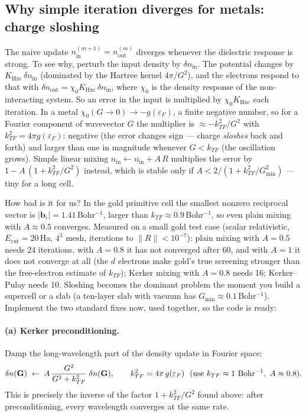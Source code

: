 \subsection{Why simple iteration diverges for metals: charge sloshing}

The naive update $n_{\mathrm{in}}^{(m+1)} = n_{\mathrm{out}}^{(m)}$ diverges
whenever the dielectric response is strong. To see why, perturb the input
density by $\delta n_{\mathrm{in}}$. The potential changes by
$K_{\mathrm{Hxc}}\,\delta n_{\mathrm{in}}$ (dominated by the Hartree
kernel $4\pi/G^2$), and the electrons respond to that with
$\delta n_{\mathrm{out}} = \chi_0 K_{\mathrm{Hxc}}\,\delta n_{\mathrm{in}}$,
where $\chi_0$ is the density response of the non-interacting system. So an
error in the input is multiplied by $\chi_0 K_{\mathrm{Hxc}}$ each
iteration. In a metal $\chi_0(G\to0) \to -g(\varepsilon_F)$, a finite
negative number, so for a Fourier component of wavevector $G$ the
multiplier is $\approx -k_{TF}^2/G^2$ with $k_{TF}^2 = 4\pi
g(\varepsilon_F)$: negative (the error changes sign --- charge
\emph{sloshes} back and forth) and larger than one in magnitude whenever
$G < k_{TF}$ (the oscillation grows). Simple linear mixing
$n_{\mathrm{in}} \gets n_{\mathrm{in}} + A\,R$ multiplies the error by
$1 - A\,(1 + k_{TF}^2/G^2)$ instead, which is stable only if
$A < 2/(1 + k_{TF}^2/G_{\min}^2)$ --- tiny for a long cell.

How bad is it for us? In the gold primitive cell the smallest nonzero
reciprocal vector is $|\mathbf b_i| = 1.41$\,Bohr$^{-1}$, larger than
$k_{TF} \approx 0.9$\,Bohr$^{-1}$, so even plain mixing with
$A \approx 0.5$ converges. Measured on a small gold test case (scalar
relativistic, $E_{\mathrm{cut}} = 20$\,Ha, $4^3$ mesh, iterations to
$\|R\| < 10^{-7}$): plain mixing with $A = 0.5$ needs 24 iterations, with
$A = 0.8$ it has not converged after 60, and with $A = 1$ it does not
converge at all (the $d$ electrons make gold's true screening stronger
than the free-electron estimate of $k_{TF}$); Kerker mixing with $A = 0.8$
needs 16; Kerker--Pulay needs 10. Sloshing becomes the dominant problem the
moment you build a supercell or a slab (a ten-layer slab with vacuum has
$G_{\min} \approx 0.1$\,Bohr$^{-1}$). Implement the two standard fixes now, used
together, so the code is ready:

\paragraph{(a) Kerker preconditioning.} Damp the long-wavelength part of the
density update in Fourier space:
\begin{equation}
\delta n(\mathbf{G}) \;\gets\; A\, \frac{G^2}{G^2 + k_{TF}^2}\; \delta n(\mathbf{G}),
\qquad k_{TF}^2 = 4\pi\, g(\varepsilon_F) \ \ (\text{use } k_{TF} \approx
1\ \mathrm{Bohr}^{-1},\ A \approx 0.8).
\label{eq:kerker}
\end{equation}
This is precisely the inverse of the factor $1 + k_{TF}^2/G^2$ found above:
after preconditioning, every wavelength converges at the same rate.

